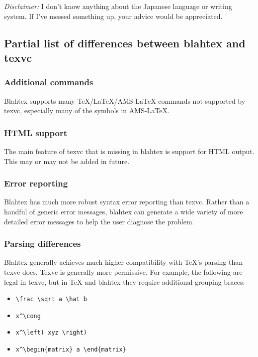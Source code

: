 \documentclass{article}
\newcommand{\texcommand}[1]{\textbackslash{}#1}
\begin{document}
\textit{Disclaimer:} I don't know anything about the Japanese language or writing system. If I've messed something up, your advice would be appreciated.


\subsection{Partial list of differences between blahtex and texvc}

\subsubsection{Additional commands}

Blahtex supports many \TeX/\LaTeX/AMS-\LaTeX{} commands not supported by texvc, especially many of the symbols in AMS-\LaTeX.

\subsubsection{HTML support}

The main feature of texvc that is missing in blahtex is support for HTML output. This may or may not be added in future.

\subsubsection{Error reporting}

Blahtex has much more robust syntax error reporting than texvc. Rather than a handful of generic error messages, blahtex can generate a wide variety of more detailed error messages to help the user diagnose the problem.

\subsubsection{Parsing differences}

Blahtex generally achieves much higher compatibility with \TeX{}'s parsing than texvc does. Texvc is generally more permissive. For example, the following are legal in texvc, but in \TeX{} and blahtex they require additional grouping braces:
\begin{itemize}
\item \texttt{\texcommand{frac} \texcommand{sqrt} a \texcommand{hat} b}
\item \texttt{x\textasciicircum\texcommand{cong}}
\item \texttt{x\textasciicircum\texcommand{left}( xyz \texcommand{right})}
\item \texttt{x\textasciicircum\texcommand{begin}\{matrix\} a \texcommand{end}\{matrix\}}
\end{itemize}
\end{document}
